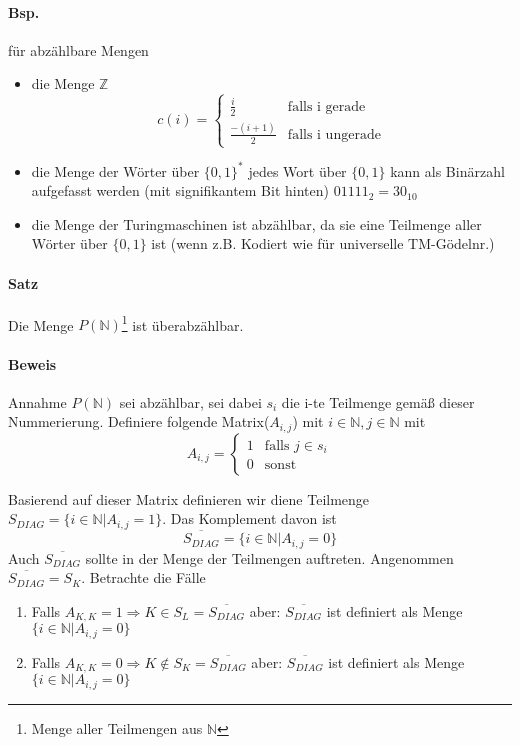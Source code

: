 \paragraph*{Bsp.} für abzählbare Mengen
\begin{itemize}
	\item die Menge $\mathbb{Z}$ $$ c(i)= \begin{cases}\frac{i}{2} & \text{falls i gerade}\\ \frac{-(i+1)}{2} & \text{falls i ungerade}\end{cases} $$ %
	\item die Menge der Wörter über $\{0,1\}^*$ jedes Wort über $\{0,1\}$ kann als Binärzahl aufgefasst werden (mit signifikantem Bit hinten) $01111_2=30_{10}$
	\item die Menge der Turingmaschinen ist abzählbar, da sie eine Teilmenge aller Wörter über $\{0,1\}$ ist (wenn z.B. Kodiert wie für universelle TM-Gödelnr.)
\end{itemize}

\paragraph*{Satz} Die Menge $P(\mathbb{N})$\footnote{Menge aller Teilmengen aus $\mathbb{N}$} ist überabzählbar.

\paragraph*{Beweis} Annahme $P(\mathbb{N})$ sei abzählbar, sei dabei $s_i$ die i-te Teilmenge gemäß dieser Nummerierung. Definiere folgende Matrix($A_{i,j}$) mit $i\in\mathbb{N},j\in\mathbb{N}$ mit $$ A_{i,j} = \begin{cases}1&\text{falls } j\in s_i \\ 0 & \text{sonst}\end{cases} $$ 

\para{} Basierend auf dieser Matrix definieren wir diene Teilmenge $S_{DIAG}=\{ i\in\mathbb{N}|A_{i,j}=1 \}$. Das Komplement davon ist $$ \overline{S_{DIAG}}=\{i\in\mathbb{N}|A_{i,j}=0\} $$ Auch $\overline{S_{DIAG}}$ sollte in der Menge der Teilmengen auftreten. Angenommen $\overline{S_{DIAG}} = S_K$. Betrachte die Fälle
\begin{enumerate}
	\item Falls $A_{K,K}=1 \Rightarrow K \in S_L = \overline{S_{DIAG}}$ aber: $\overline{S_{DIAG}}$ ist definiert als Menge $\{i\in\mathbb{N}|A_{i,j}=0\}$ %
	\item Falls $A_{K,K}=0 \Rightarrow K \not\in S_K = \overline{S_{DIAG}}$ aber: $\overline{S_{DIAG}}$ ist definiert als Menge $\{i\in\mathbb{N}|A_{i,j}=0\}$ %
\end{enumerate}


